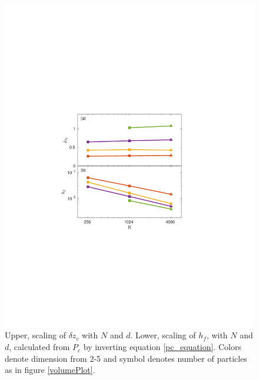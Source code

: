 \begin{figure}[ht!]
\centering
\includegraphics[width=\columnwidth, trim=138 254 176 268, clip]{forceVolumeEntropyPaper/lnhg.pdf}
\caption{Upper, scaling of $\delta z_c$ with $N$ and $d$. Lower, scaling of $h_f$, with $N$ and $d$, calculated from $P_c$ by inverting equation \ref{pc_equation}.  Colors denote dimension from 2-5 and symbol denotes number of particles as in figure \ref{volumePlot}. }
\label{lnhgPlot}
\end{figure}

%
%

